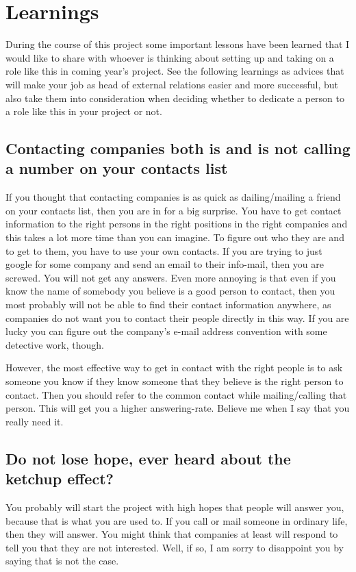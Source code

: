 \section{Learnings}\label{sec:learnings}
During the course of this project some important lessons have been learned that I would like to share with whoever is thinking about setting up and taking on a role like this in coming year's project. See the following learnings as advices that will make your job as head of external relations easier and more successful, but also take them into consideration when deciding whether to dedicate a person to a role like this in your project or not.

\subsection{Contacting companies both is and is not calling a number on your contacts list}
If you thought that contacting companies is as quick as dailing/mailing a friend on your contacts list, then you are in for a big surprise. You have to get contact information to the right persons in the right positions in the right companies and this takes a lot more time than you can imagine. To figure out who they are and to get to them, you have to use your own contacts. If you are trying to just google for some company and send an email to their info-mail, then you are screwed. You will not get any answers. Even more annoying is that even if you know the name of somebody you believe is a good person to contact, then you most probably will not be able to find their contact information anywhere, as companies do not want you to contact their people directly in this way. If you are lucky you can figure out the company's e-mail address convention with some detective work, though. 

However, the most effective way to get in contact with the right people is to ask someone you know if they know someone that they believe is the right person to contact. Then you should refer to the common contact while mailing/calling that person. This will get you a higher answering-rate. Believe me when I say that you really need it.

\subsection{Do not lose hope, ever heard about the ketchup effect?}
You probably will start the project with high hopes that people will answer you, because that is what you are used to. If you call or mail someone in ordinary life, then they will answer. You might think that companies at least will respond to tell you that they are not interested. Well, if so, I am sorry to disappoint you by saying that is not the case.

